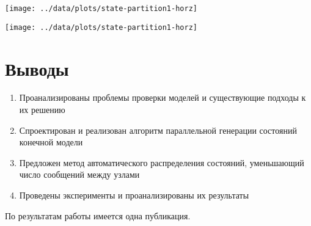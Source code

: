 \documentclass[12pt]{article}
\begin{document}
\begin{minipage}[m]{0.5\linewidth}
  \texttt{[image: ../data/plots/state-partition1-horz]}  
\end{minipage}
\begin{minipage}[m]{0.5\linewidth}
  \texttt{[image: ../data/plots/state-partition1-horz]}  
\end{minipage}


\section{Выводы}
\label{sec:conclusion}

\small
\begin{enumerate}
\item Проанализированы проблемы проверки моделей и существующие подходы к их решению
\item Спроектирован и реализован алгоритм параллельной генерации состояний конечной
  модели
\item Предложен метод автоматического распределения состояний, уменьшающий число сообщений
  между узлами
\item Проведены эксперименты и проанализированы их результаты
\end{enumerate}

По результатам работы имеется одна публикация.
\end{document}
